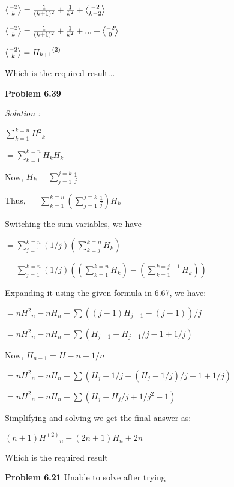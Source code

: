 \documentclass[12pt]{article}
\def \bangle{ \atopwithdelims \langle \rangle}
\begin{document}
${-2 \bangle k} = \frac{1}{(k+1)^2}+\frac{1}{k^2}+{-2 \bangle k-2}$

${-2 \bangle k} = \frac{1}{(k+1)^2}+\frac{1}{k^2}+...+{-2 \bangle 0}$

${-2 \bangle k} = {H_{k+1}}^{(2)} $

Which is the required result...

\medskip

\medskip

\noindent
{\bf Problem 6.39}

\textit {Solution :}

$\sum_{k=1}^{k=n} {H^2}_k$

$= \sum_{k=1}^{k=n} H_k H_k$

Now, $H_k = \sum_{j=1}^{j=k}{\frac{1}{j}}$

Thus, $= \sum_{k=1}^{k=n} {(\sum_{j=1}^{j=k}{\frac{1}{j}})} H_k$

Switching the sum variables, we have

$= \sum_{j=1}^{k=n} {(1/j)(\sum_{k=j}^{k=n}H_k)}$

$= \sum_{j=1}^{k=n} {(1/j)((\sum_{k=1}^{k=n}H_k)-(\sum_{k=1}^{k=j-1}H_k))}$

Expanding it using the given formula in 6.67, we have:

$= n{H^2}_n - nH_n - \sum {((j-1)H_{j-1}-(j-1))}/j$

$= n{H^2}_n - nH_n - \sum(H_{j-1} - H_{j-1}/j -1 +1/j)$

Now, $H_{n-1} = H-n - 1/n$

$= n{H^2}_n - nH_n - \sum(H_{j} -1/j - (H_{j}-1/j)/j -1 +1/j)$

$= n{H^2}_n - nH_n - \sum(H_{j} -H_j/j + 1/j^2 -1)$

Simplifying  and solving we get the final answer as:

$(n+1){H^(2)}_n - (2n+1)H_n + 2n$

Which is the required result

\noindent
{\bf Problem 6.21} Unable to solve after trying
\end{document}
